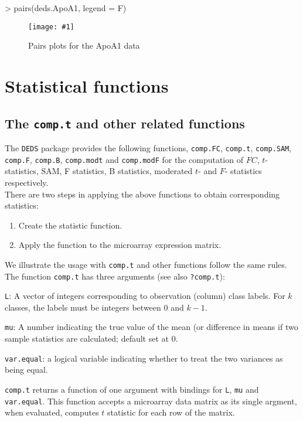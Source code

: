 \documentclass[11pt]{article}
\newcommand{\code}[1]{{\tt #1}}
\newcommand{\Rfunc}[1]{{\tt #1}}
\newcommand{\myincfig}[3]{%
  \begin{figure}[htbp]
    \begin{center}
      \texttt{[image: \#1]}
      \caption{\label{#1}#3}
    \end{center}
  \end{figure}
}
\begin{document}
\begin{Schunk}
\begin{Sinput}
> pairs(deds.ApoA1, legend = F)
\end{Sinput}
\end{Schunk}

\myincfig{DEDS-pairsApoA1}{\textwidth}{Pairs plots for the ApoA1 data}

\section{Statistical functions}

\subsection{The \Rfunc{comp.t} and other related functions}

The \code{DEDS} package provides the following functions, \Rfunc{comp.FC},
\Rfunc{comp.t}, \Rfunc{comp.SAM}, \Rfunc{comp.F}, \Rfunc{comp.B},
\Rfunc{comp.modt} and \Rfunc{comp.modF} for the computation
of $FC$, $t$-statistics, SAM, F statistics, B statistics, moderated $t$- and
$F$- statistics respectively. \\

There are two steps in applying the above functions to obtain corresponding 
statistics:
\begin{enumerate}
\item Create the statistic function.
\item Apply the function to the microarray expression matrix.
\end{enumerate}

We illustrate the usage with \Rfunc{comp.t} and other functions follow the 
same rules. The function \Rfunc{comp.t} has 
three arguments (see also {\tt ?comp.t}):
\begin{description}
  \item 
    {{\tt L}: }{ A vector of integers corresponding to observation (column)
    class labels. For $k$ classes, the labels must be integers
    between 0 and $k-1$.}
  \item
    {{\tt mu}: }{ A number indicating the true value of the mean (or
    difference in means if two sample statistics are calculated; default set 
    at 0.}
  \item
    {{\tt var.equal}: }{ a logical variable indicating whether to treat the
     two variances as being equal.}
\end{description}
{\tt comp.t} returns a function of one argument with bindings for
{\tt L}, {\tt mu} and {\tt var.equal}. This function accepts a
microarray data matrix as its single argment, when evaluated, computes
$t$ statistic for each row of the matrix.
\end{document}
